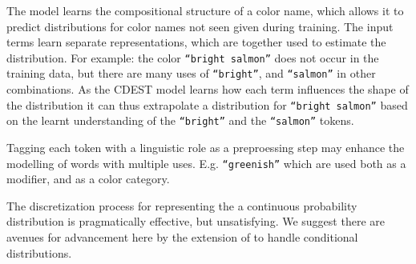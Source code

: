 \documentclass[11pt,letterpaper]{article}
\newcommand{\textcite}{\newcite}
\begin{document}
The model learns the compositional structure of a color name, which allows it to predict distributions for color names not seen given during training.
The input terms learn separate representations, which are together used to estimate the distribution.
For example: the color \texttt{``bright salmon''} does not occur in the training data, but there are many uses of \texttt{``bright''}, and \texttt{``salmon''} in other combinations.
As the CDEST model learns how each term influences the shape of the distribution it can thus extrapolate a distribution for \texttt{``bright salmon''} based on the learnt understanding of the \texttt{``bright''} and the \texttt{``salmon''} tokens.

Tagging each token with a linguistic role as a preproessing step
may enhance the modelling of words with multiple uses. E.g. \texttt{``greenish''} which are used both as a modifier, and as a color category.

The discretization process for representing the a continuous probability distribution is pragmatically effective, but unsatisfying.
We suggest there are avenues for advancement here by the extension of \textcite{magdon1998neural} to handle conditional distributions.


\clearpage



\end{document}
